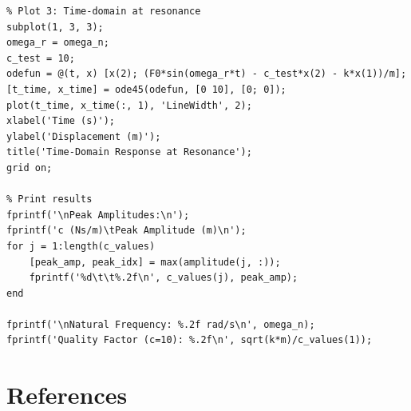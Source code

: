 \documentclass[12pt,a4paper]{article}
\begin{document}
\begin{verbatim}
% Plot 3: Time-domain at resonance
subplot(1, 3, 3);
omega_r = omega_n;
c_test = 10;
odefun = @(t, x) [x(2); (F0*sin(omega_r*t) - c_test*x(2) - k*x(1))/m];
[t_time, x_time] = ode45(odefun, [0 10], [0; 0]);
plot(t_time, x_time(:, 1), 'LineWidth', 2);
xlabel('Time (s)');
ylabel('Displacement (m)');
title('Time-Domain Response at Resonance');
grid on;

% Print results
fprintf('\nPeak Amplitudes:\n');
fprintf('c (Ns/m)\tPeak Amplitude (m)\n');
for j = 1:length(c_values)
    [peak_amp, peak_idx] = max(amplitude(j, :));
    fprintf('%d\t\t%.2f\n', c_values(j), peak_amp);
end

fprintf('\nNatural Frequency: %.2f rad/s\n', omega_n);
fprintf('Quality Factor (c=10): %.2f\n', sqrt(k*m)/c_values(1));
\end{verbatim}

\newpage

\section*{References}
\end{document}
